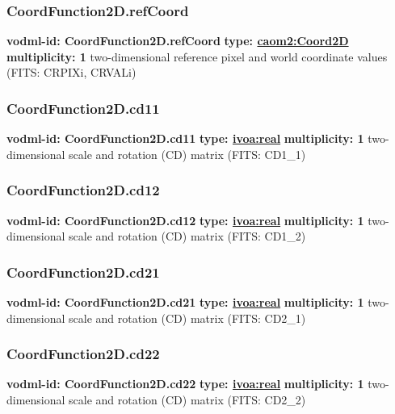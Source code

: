     \subsubsection{CoordFunction2D.refCoord}
      \textbf{vodml-id: CoordFunction2D.refCoord} \newline
      \textbf{type: \hyperref[sect:Coord2D]{caom2:Coord2D}} \newline
      \textbf{multiplicity: 1} \newline
      two-dimensional reference pixel and world coordinate values (FITS: CRPIXi, CRVALi)

    \subsubsection{CoordFunction2D.cd11}
      \textbf{vodml-id: CoordFunction2D.cd11} \newline
      \textbf{type: \hyperref[sect:ivoa]{ivoa:real}} \newline
      \textbf{multiplicity: 1} \newline
      two-dimensional scale and rotation (CD) matrix (FITS: CD1\_1)

    \subsubsection{CoordFunction2D.cd12}
      \textbf{vodml-id: CoordFunction2D.cd12} \newline
      \textbf{type: \hyperref[sect:ivoa]{ivoa:real}} \newline
      \textbf{multiplicity: 1} \newline
      two-dimensional scale and rotation (CD) matrix (FITS: CD1\_2)

    \subsubsection{CoordFunction2D.cd21}
      \textbf{vodml-id: CoordFunction2D.cd21} \newline
      \textbf{type: \hyperref[sect:ivoa]{ivoa:real}} \newline
      \textbf{multiplicity: 1} \newline
      two-dimensional scale and rotation (CD) matrix (FITS: CD2\_1)

    \subsubsection{CoordFunction2D.cd22}
      \textbf{vodml-id: CoordFunction2D.cd22} \newline
      \textbf{type: \hyperref[sect:ivoa]{ivoa:real}} \newline
      \textbf{multiplicity: 1} \newline
      two-dimensional scale and rotation (CD) matrix (FITS: CD2\_2)


